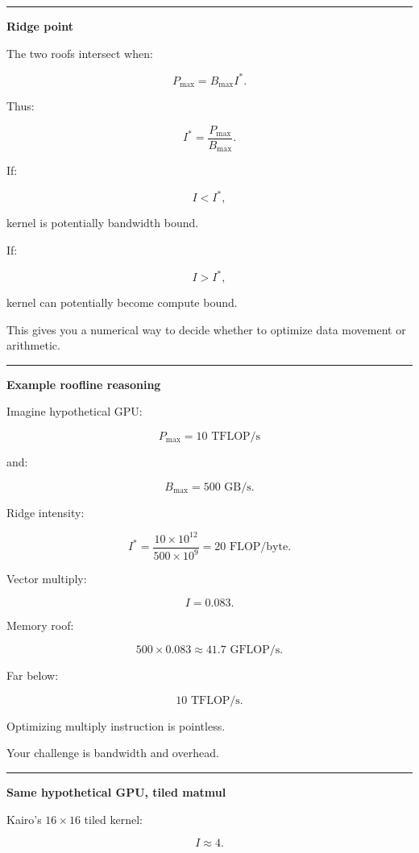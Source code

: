 \begin{center}\rule{0.5\linewidth}{0.5pt}\end{center}

\textbf{Ridge point}

The two roofs intersect when:

\[
P_{\max}
=
B_{\max}I^*.
\]

Thus:

\[
\boxed{
I^*
=
\frac{
P_{\max}
}{
B_{\max}
}.
}
\]

If:

\[
I<I^*,
\]

kernel is potentially bandwidth bound.

If:

\[
I>I^*,
\]

kernel can potentially become compute bound.

This gives you a numerical way to decide whether to optimize data movement or arithmetic.

\begin{center}\rule{0.5\linewidth}{0.5pt}\end{center}

\textbf{Example roofline reasoning}

Imagine hypothetical GPU:

\[
P_{\max}=10\text{ TFLOP/s}
\]

and:

\[
B_{\max}=500\text{ GB/s}.
\]

Ridge intensity:

\[
I^*
=
\frac{
10\times10^{12}
}{
500\times10^9
}
=
20\text{ FLOP/byte}.
\]

Vector multiply:

\[
I=0.083.
\]

Memory roof:

\[
500\times0.083
\approx41.7\text{ GFLOP/s}.
\]

Far below:

\[
10\text{ TFLOP/s}.
\]

Optimizing multiply instruction is pointless.

Your challenge is bandwidth and overhead.

\begin{center}\rule{0.5\linewidth}{0.5pt}\end{center}

\textbf{Same hypothetical GPU, tiled matmul}

Kairo's \(16\times16\) tiled kernel:

\[
I\approx4.
\]

